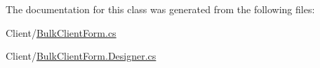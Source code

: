 The documentation for this class was generated from the following files\+:\begin{DoxyCompactItemize}
\item 
Client/\mbox{\hyperlink{_bulk_client_form_8cs}{Bulk\+Client\+Form.\+cs}}\item 
Client/\mbox{\hyperlink{_bulk_client_form_8_designer_8cs}{Bulk\+Client\+Form.\+Designer.\+cs}}\end{DoxyCompactItemize}
